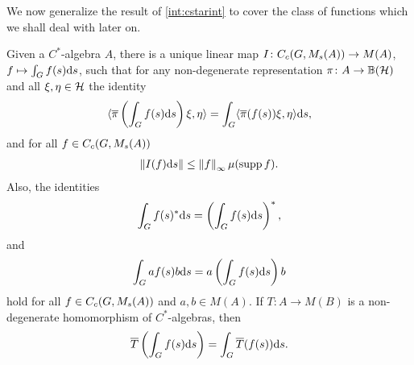 We now generalize the result of \cref{int:cstarint} to cover the class of functions which we shall deal with later on.
\begin{theorem}
	Given a $C^*$-algebra $A$, there is a unique linear map $I\colon C_c(G,M_s(A)) \to M(A)$, $f \mapsto \int_G f(s) \mathrm{d} s$, such that for any non-degenerate representation $\pi \colon A \to \mathbb{B}(\mathcal{H})$ and all $\xi, \eta \in \mathcal{H}$ the identity
	\begin{align}
		\langle \overline \pi \left( \int_G f(s) \mathrm{d} s \right) \xi , \eta \rangle = \int_{G} \langle \overline \pi(f(s)) \xi , \eta \rangle \mathrm{d} s,
		\label{mult:1.35}
	\end{align}
	and for all $f \in C_c(G,M_s(A))$
	\begin{align}
		\left\lVert I(f) \mathrm{d} s \right\rVert \leq \left\lVert f \right\rVert _{ \infty} \mu(\operatorname{supp} f ).
	\end{align}
	Also, the identities
	\begin{align}
		\int_G f(s) ^* \mathrm{d} s = \left( \int_G f(s) \mathrm{d} s \right)^*,
	\end{align}
	and
	\begin{align}
		\int_G a f(s) b \mathrm{d} s = a \left( \int_G f(s) \mathrm{d} s  \right) b
	\end{align}
	hold for all $f \in C_c(G,M_s(A))$ and $a,b \in M(A)$. If $T \colon A \to M(B)$ is a non-degenerate homomorphism of $C^*$-algebras, then
	\begin{align}
		\overline T \left( \int_G f(s) \mathrm{d} s\right) = \int_G \overline T (f(s)) \mathrm{d} s.
	\end{align}

	\label{int:multstrictintegral}
\end{theorem}
